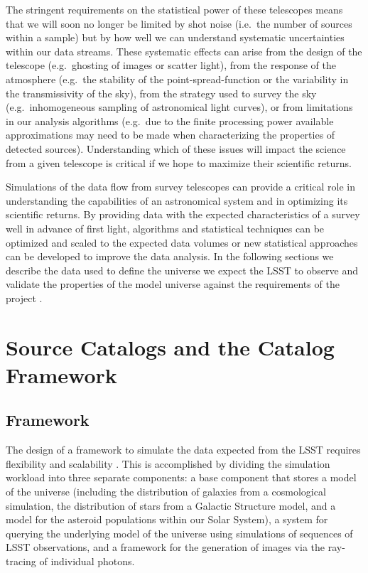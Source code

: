 \documentclass[]{article}
\begin{document}
The stringent requirements on the statistical power of these
telescopes means that we will soon no longer be limited by shot noise
(i.e.\ the number of sources within a sample) but by how well we can
understand systematic uncertainties within our data streams. These
systematic effects can arise from the design of the telescope
(e.g.\ ghosting of images or scatter light), from the response of the
atmosphere (e.g.\ the stability of the point-spread-function or the
variability in the transmissivity of the sky), from the strategy used
to survey the sky (e.g.\ inhomogeneous sampling of astronomical light
curves), or from limitations in our analysis algorithms (e.g.\ due to
the finite processing power available approximations may need to be
made when characterizing the properties of detected
sources). Understanding which of these issues will impact the science
from a given telescope is critical if we hope to maximize their
scientific returns.

Simulations of the data flow from survey telescopes can provide a
critical role in understanding the capabilities of an astronomical
system and in optimizing its scientific returns. By providing data
with the expected characteristics of a survey well in advance of first
light, algorithms and statistical techniques can be optimized and
scaled to the expected data volumes or new statistical approaches can
be developed to improve the data analysis. 
In the following sections we describe the data used to define the universe
we expect the LSST to observe and validate the properties of the model
universe against the requirements of the project \citep{requirements}.

\section{Source Catalogs and the Catalog Framework}

\subsection{Framework}


The design of a framework to simulate the data expected from the LSST
requires flexibility and scalability \citep{connolly10}.
This is accomplished by dividing the simulation workload into three
separate components: a base component that stores a model of the
universe (including the distribution of galaxies from a cosmological
simulation, the distribution of stars from a Galactic Structure model,
and a model for the asteroid populations within our Solar System), a
system for querying the underlying model of the universe using
simulations of sequences of LSST observations, and a framework for the
generation of images via the ray-tracing of individual photons.
\end{document}
